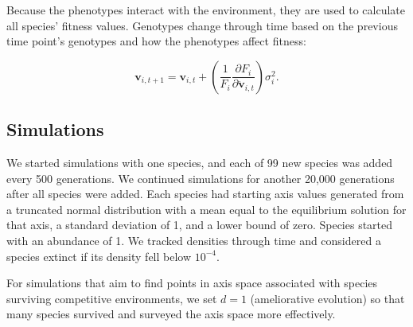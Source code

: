 
Because the phenotypes interact with the environment, they are used
to calculate all species' fitness values.
Genotypes change through time based on the previous time point's 
genotypes and how the phenotypes affect fitness:

\begin{equation} \label{eq:axis-change-stochastic}
    \mathbf{v}_{i,t+1} = \mathbf{v}_{i,t} + \left( \frac{1}{F_i}
        \frac{\partial F_i}{\partial \mathbf{\ddot{v}}_{i,t}} \right) \sigma^2_i
    \textrm{.}
\end{equation}





\subsection*{Simulations}

We started simulations with one species, and each of 99 new species
was added every 500 generations.
We continued simulations for another 20,000 generations after all
species were added.
Each species had starting axis values generated from a truncated normal distribution 
with a mean equal to the equilibrium solution for that axis,
a standard deviation of 1, and a lower bound of zero.
Species started with an abundance of 1.
We tracked densities through time and considered a species extinct if its 
density fell below $10^{-4}$.



For simulations that aim to find points in axis space associated with
species surviving competitive environments, we set $d = 1$ 
(ameliorative evolution) so that many species
survived and surveyed the axis space more effectively.


